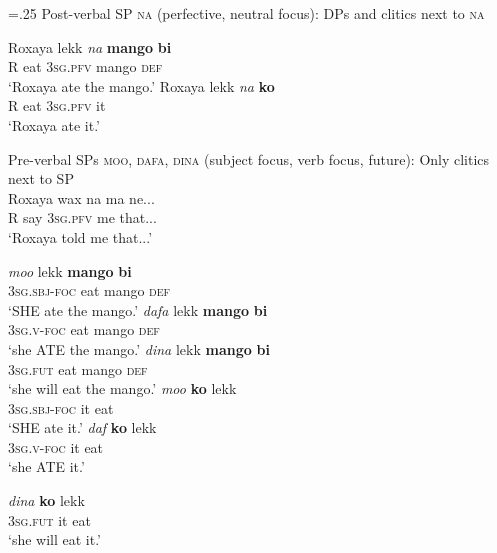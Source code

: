 \documentclass[output=paper]{langscibook}
\begin{document}
\begin{exe}
\multicolsep=.25\baselineskip
\ex \label{ex:newman:situ}Post-verbal SP \textsc{na} (perfective, neutral focus): DPs and clitics next to \textsc{na}
	\begin{xlist}
		\ex
		\gll Roxaya lekk \emph{na} \textbf{mango} \textbf{bi} \\ 
		R eat \textsc{3sg.pfv} mango \textsc{def} \\ 
		\trans `Roxaya ate the mango.'
		\ex 
		\gll Roxaya lekk \emph{na} \textbf{ko} \\ 
		R eat \textsc{3sg.pfv} it \\
		\trans `Roxaya ate it.'
	\end{xlist}
	
\ex \label{ex:newman:climb}
	Pre-verbal SPs \textsc{moo, dafa, dina} (subject focus, verb focus, future): Only clitics next to SP\\
	\gll Roxaya wax na ma ne...\\
	R say \textsc{3sg.pfv} me that...\\
	\trans `Roxaya told me that...'
	\begin{multicols}{2}
	\begin{xlist}
		\ex 
		\gll \emph{moo} lekk \textbf{mango} \textbf{bi} \\ 
		 3\textsc{sg.sbj-foc} eat mango \textsc{def} \\
		\trans `SHE ate the mango.'
		\ex 
		\gll \emph{dafa} lekk \textbf{mango} \textbf{bi}\\
		3\textsc{sg.v-foc} eat mango \textsc{def} \\
		\trans `she ATE the mango.'
		\ex 
		\gll \emph{dina} lekk \textbf{mango} \textbf{bi}\\
		3\textsc{sg.fut} eat mango \textsc{def}\\
		\trans `she will eat the mango.'
		\ex
		\gll  \emph{moo} \textbf{ko} lekk \\ 
		 3\textsc{sg.sbj-foc} it eat \\
		\trans `SHE ate it.'
		\ex 
		\gll \emph{daf} \textbf{ko} lekk\\
		3\textsc{sg.v-foc} it eat \\
		\trans `she ATE it.'

		\ex 
		\gll \emph{dina} \textbf{ko} lekk \\
		3\textsc{sg.fut} it eat\\
		\trans `she will eat it.'

	\end{xlist}
	\end{multicols}
\end{exe}
\end{document}
